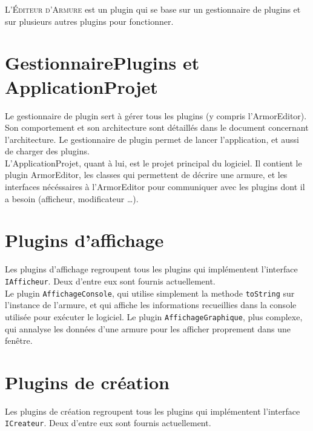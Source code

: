 

L'\textsc{\'Editeur d'Armure} est un plugin qui se base sur un gestionnaire de plugins et sur plusieurs autres plugins pour fonctionner. \\


\section{GestionnairePlugins et ApplicationProjet}

Le gestionnaire de plugin sert à gérer tous les plugins (y compris l'ArmorEditor). Son comportement et son architecture sont détaillés dans le document concernant l'architecture. Le gestionnaire de plugin permet de lancer l'application, et aussi de charger des plugins. \\

L'ApplicationProjet, quant à lui, est le projet principal du logiciel. Il contient le plugin ArmorEditor, les classes qui permettent de décrire une armure, et les interfaces nécéssaires à l'ArmorEditor pour communiquer avec les plugins dont il a besoin (afficheur, modificateur \dots).


\section{Plugins d'affichage}

Les plugins d'affichage regroupent tous les plugins qui implémentent l'interface \texttt{IAfficheur}. Deux d'entre eux sont fournis actuellement.\\

Le plugin \texttt{AffichageConsole}, qui utilise simplement la methode \texttt{toString} sur l'instance de l'armure, et qui affiche les informations recueillies dans la console utilisée pour exécuter le logiciel. Le plugin \texttt{AffichageGraphique}, plus complexe, qui annalyse les données d'une armure pour les afficher proprement dans une fenêtre.


\section{Plugins de création}

Les plugins de création regroupent tous les plugins qui implémentent l'interface \texttt{ICreateur}. Deux d'entre eux sont fournis actuellement.\\

